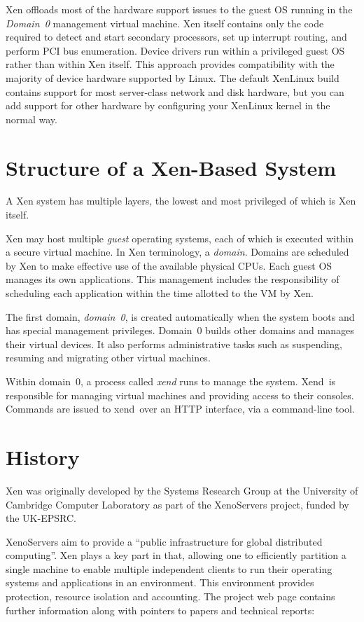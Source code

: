 \documentclass[11pt,twoside,final,openright]{report}
\def\Xend{{Xend}\xspace}
\def\xend{{xend}\xspace}
\begin{document}
Xen offloads most of the hardware support issues to the guest OS
running in the \emph{Domain~0} management virtual machine. Xen itself
contains only the code required to detect and start secondary
processors, set up interrupt routing, and perform PCI bus
enumeration. Device drivers run within a privileged guest OS rather
than within Xen itself. This approach provides compatibility with the
majority of device hardware supported by Linux. The default XenLinux
build contains support for most server-class network and disk
hardware, but you can add support for other hardware by configuring
your XenLinux kernel in the normal way.


\section{Structure of a Xen-Based System}

A Xen system has multiple layers, the lowest and most privileged of
which is Xen itself.

Xen may host multiple \emph{guest} operating systems, each of which is
executed within a secure virtual machine. In Xen terminology, a
\emph{domain}. Domains are scheduled by Xen to make effective use of the
available physical CPUs. Each guest OS manages its own applications.
This management includes the responsibility of scheduling each
application within the time allotted to the VM by Xen.

The first domain, \emph{domain~0}, is created automatically when the
system boots and has special management privileges. Domain~0 builds
other domains and manages their virtual devices. It also performs
administrative tasks such as suspending, resuming and migrating other
virtual machines.

Within domain~0, a process called \emph{xend} runs to manage the system.
\Xend\ is responsible for managing virtual machines and providing access
to their consoles. Commands are issued to \xend\ over an HTTP interface,
via a command-line tool.


\section{History}

Xen was originally developed by the Systems Research Group at the
University of Cambridge Computer Laboratory as part of the XenoServers
project, funded by the UK-EPSRC\@.

XenoServers aim to provide a ``public infrastructure for global
distributed computing''. Xen plays a key part in that, allowing one to
efficiently partition a single machine to enable multiple independent
clients to run their operating systems and applications in an
environment. This environment provides protection, resource isolation
and accounting. The project web page contains further information along
with pointers to papers and technical reports:
\end{document}
